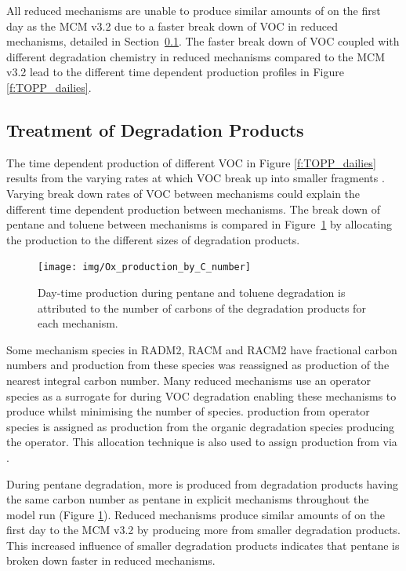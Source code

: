 All reduced mechanisms are unable to produce similar amounts of  on the first day as the MCM v3.2 due to a faster break down of VOC in reduced mechanisms, detailed in \mbox{Section \ref{ss:products}}.
The faster break down of VOC coupled with different degradation chemistry in reduced mechanisms compared to the MCM v3.2 lead to the different time dependent  production profiles in Figure \ref{f:TOPP_dailies}.


\subsection{Treatment of Degradation Products} \label{ss:products} 

The time dependent  production of different VOC in Figure \ref{f:TOPP_dailies} results from the varying rates at which VOC break up into smaller fragments \citep{Butler:2011}.
Varying break down rates of VOC between mechanisms could explain the different time dependent  production between mechanisms.
The break down of pentane and toluene between mechanisms is compared in \mbox{Figure \ref{f:carbon}} by allocating the  production to the different sizes of degradation products.

\begin{figure}
    \centering
    \texttt{[image: img/Ox\_production\_by\_C\_number]}
    \vspace{0mm}
    \caption{Day-time  production during pentane and toluene degradation is attributed to the number of carbons of the degradation products for each mechanism.}
    \vspace{-4mm}
    \label{f:carbon}
\end{figure}

Some mechanism species in RADM2, RACM and RACM2 have fractional carbon numbers \citep{Stockwell:1990, Stockwell:1997, Goliff:2013} and  production from these species was reassigned as  production of the nearest integral carbon number.  
Many reduced mechanisms use an operator species as a surrogate for  during VOC degradation enabling these mechanisms to produce  whilst minimising the number of  species.
 production from operator species is assigned as  production from the organic degradation species producing the operator.
This allocation technique is also used to assign  production from  via .

During pentane degradation, more  is produced from degradation products having the same carbon number as pentane in explicit mechanisms throughout the model run (Figure \ref{f:carbon}).
Reduced mechanisms produce similar amounts of  on the first day to the MCM v3.2 by producing more  from smaller degradation products.
This increased influence of smaller degradation products indicates that pentane is broken down faster in reduced mechanisms.

